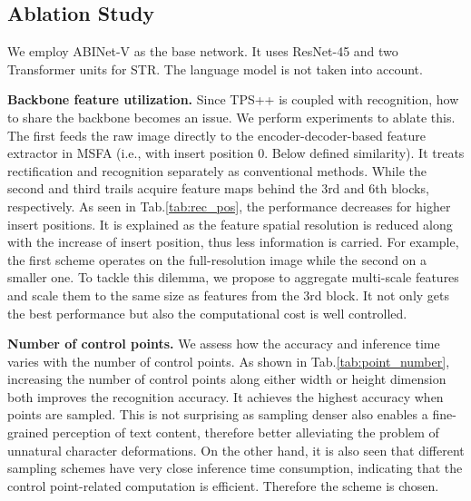 \documentclass{article}
\begin{document}
\subsection{Ablation Study}
We employ ABINet-V \cite{ABInet21CVPR} as the base network. It uses ResNet-45 and two Transformer units for STR. The language model is not taken into account. 


\noindent\textbf{Backbone feature utilization.}
Since TPS++ is coupled with recognition, how to share the backbone becomes an issue. We perform experiments to ablate this. The first feeds the raw image directly to the encoder-decoder-based feature extractor in MSFA (i.e., with insert position 0. Below defined similarity). It treats rectification and recognition separately as conventional methods. While the second and third trails acquire feature maps behind the 3rd and 6th blocks, respectively. As seen in Tab.\ref{tab:rec_pos}, the performance decreases for higher insert positions. It is explained as the feature spatial resolution is reduced along with the increase of insert position, thus less information is carried. For example, the first scheme operates on the full-resolution image while the second on a  smaller one. To tackle this dilemma, we propose to aggregate multi-scale features and scale them to the same size as features from the 3rd block. It not only gets the best performance but also the computational cost is well controlled.

\begin{table}[t]
\caption{Ablation study on backbone feature utilization.}
\label{tab:rec_pos}
\end{table}


\noindent\textbf{Number of control points.} 
We assess how the accuracy and inference time varies with the number of control points. As shown in Tab.\ref{tab:point_number}, increasing the number of control points along either width or height dimension both improves the recognition accuracy. It achieves the highest accuracy when  points are sampled. This is not surprising as sampling denser also enables a fine-grained perception of text content, therefore better alleviating the problem of unnatural character deformations. On the other hand, it is also seen that different sampling schemes have very close inference time consumption, indicating that the control point-related computation is efficient. Therefore the  scheme is chosen. 
\end{document}
